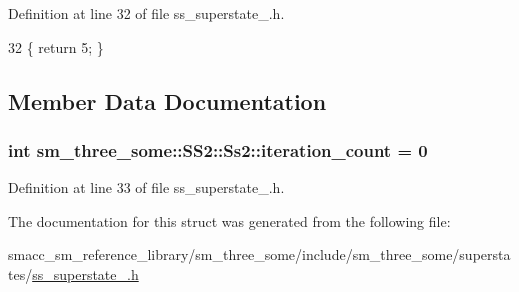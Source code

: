 Definition at line 32 of file ss\+\_\+superstate\+\_.\+h.


\begin{DoxyCode}
32 \{ \textcolor{keywordflow}{return} 5; \}
\end{DoxyCode}


\subsection{Member Data Documentation}
\subsubsection[{\texorpdfstring{iteration\+\_\+count}{iteration_count}}]{\setlength{\rightskip}{0pt plus 5cm}int sm\+\_\+three\+\_\+some\+::\+S\+S2\+::\+Ss2\+::iteration\+\_\+count = 0}\hypertarget{structsm__three__some_1_1SS2_1_1Ss2_ad0f43df403bcb029afb07a0f52699c60}{}\label{structsm__three__some_1_1SS2_1_1Ss2_ad0f43df403bcb029afb07a0f52699c60}


Definition at line 33 of file ss\+\_\+superstate\+\_.\+h.



The documentation for this struct was generated from the following file\+:\begin{DoxyCompactItemize}
\item 
smacc\+\_\+sm\+\_\+reference\+\_\+library/sm\+\_\+three\+\_\+some/include/sm\+\_\+three\+\_\+some/superstates/\hyperlink{sm__three__some_2include_2sm__three__some_2superstates_2ss__superstate__2_8h}{ss\+\_\+superstate\+\_.\+h}\end{DoxyCompactItemize}
